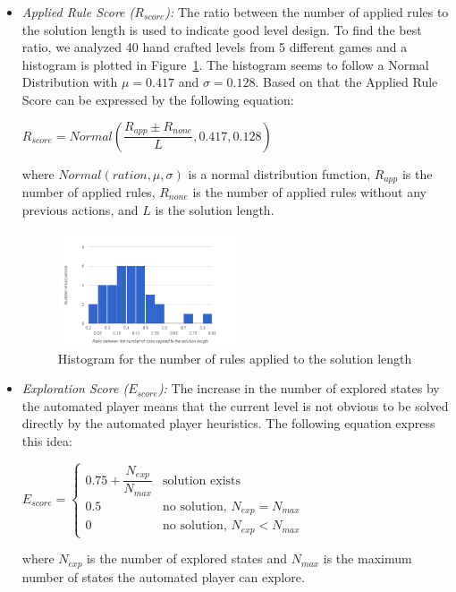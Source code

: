 \documentclass[letterpaper]{article}
\newcommand{\figref}[1]{Figure~\ref{Figure:#1}}
\begin{document}
\begin{itemize}
	\item \emph{Applied Rule Score ($R_{score}$):} The ratio between the number of applied rules to the solution length is used to indicate good level design. To find the best ratio, we analyzed 40 hand crafted levels from 5 different games and a histogram is plotted in \figref{rulesSolutionLengthHistogram}. The histogram seems to follow a Normal Distribution with $\mu = 0.417$ and $\sigma = 0.128$. Based on that the Applied Rule Score can be expressed by the following equation:
	\begin{center}$R_{score} = Normal(\dfrac{R_{app} \pm R_{none}}{L}, 0.417, 0.128)$\end{center}
	where $Normal(ration, \mu, \sigma)$ is a normal distribution function, $R_{app}$ is the number of applied rules, $R_{none}$ is the number of applied rules without any previous actions, and $L$ is the solution length.
	\begin{figure}
		\centering
		\includegraphics[width=0.5\textwidth]{Images/rulesSolutionLengthHistogram}
		\caption{Histogram for the number of rules applied to the solution length}
		\label{Figure:rulesSolutionLengthHistogram}
	\end{figure}
	
	\item \emph{Exploration Score ($E_{score}$):} The increase in the number of explored states by the automated player means that the current level is not obvious to be solved directly by the automated player heuristics. The following equation express this idea:
	\begin{center}
	$E_{score}= \begin{cases}
	               0.75 + \dfrac{N_{exp}}{N_{max}} & \text{solution exists}\\
	               0.5 & \text{no solution, }N_{exp} = N_{max}\\
	               0 & \text{no solution, }N_{exp} < N_{max}
	           \end{cases}$
	\end{center}
	where $N_{exp}$ is the number of explored states and $N_{max}$ is the maximum number of states the automated player can explore.
\end{itemize}
\end{document}
